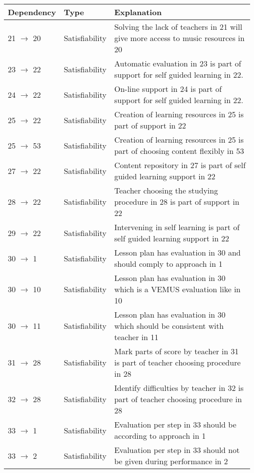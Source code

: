 \documentclass[a4paper,11pt]{article}
\begin{document}
			\begin{table}[h!]
				\begin{tabular}{l | l | p{10cm}}
					Dependency & Type & Explanation \\ \hline
					21 $\rightarrow$ 20 & Satisfiability & Solving the lack of teachers in 21 will give more access to music resources in 20 \\
					23 $\rightarrow$ 22 & Satisfiability & Automatic evaluation in 23 is part of support for self guided learning in 22. \\
					24 $\rightarrow$ 22 & Satisfiability & On-line support in 24 is part of support for self guided learning in 22. \\
					25 $\rightarrow$ 22 & Satisfiability & Creation of learning resources in 25 is part of support in 22 \\
					25 $\rightarrow$ 53 & Satisfiability & Creation of learning resources in 25 is part of choosing content flexibly in 53 \\
					27 $\rightarrow$ 22 & Satisfiability & Content repository in 27 is part of self guided learning support in 22 \\
					28 $\rightarrow$ 22 & Satisfiability & Teacher choosing the studying procedure in 28 is part of support in 22 \\
					29 $\rightarrow$ 22 & Satisfiability & Intervening in self learning is part of self guided learning support in 22 \\
					30 $\rightarrow$ 1 & Satisfiability & Lesson plan has evaluation in 30 and should comply to approach in 1 \\
					30 $\rightarrow$ 10 & Satisfiability & Lesson plan has evaluation in 30 which is a VEMUS evaluation like in 10 \\
					30 $\rightarrow$ 11 & Satisfiability & Lesson plan has evaluation in 30 which should be consistent with teacher in 11 \\
					31 $\rightarrow$ 28 & Satisfiability & Mark parts of score by teacher in 31 is part of teacher choosing procedure in 28 \\
					32 $\rightarrow$ 28 & Satisfiability & Identify difficulties by teacher in 32 is part of teacher choosing procedure in 28 \\
					33 $\rightarrow$ 1 & Satisfiability & Evaluation per step in 33 should be according to approach in 1 \\
					33 $\rightarrow$ 2 & Satisfiability & Evaluation per step in 33 should not be given during performance in 2 \\

\end{tabular}
\end{table}
\end{document}
